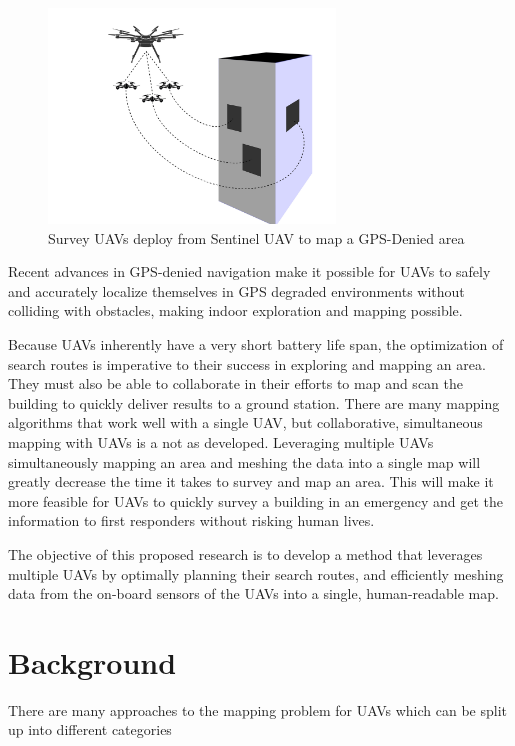 \documentclass[12pt, letterpaper]{article}
\begin{document}
\begin{figure}[h] %
	\centering
	\includegraphics[trim = 0mm 0mm 0mm 0mm,clip,width=3in]{survey_drone_illustration.png}
	\caption{Survey UAVs deploy from Sentinel UAV to map a GPS-Denied area}
	\label{fig:sentinel_survey}
\end{figure}

Recent advances in GPS-denied navigation \cite{Wheeler2017} make it possible for UAVs to safely and accurately localize themselves in GPS degraded environments without colliding with obstacles, making indoor exploration and mapping possible. 

Because UAVs inherently have a very short battery life span, the optimization of search routes is imperative to their success in exploring and mapping an area. They must also be able to collaborate in their efforts to map and scan the building to quickly deliver results to a ground station. There are many mapping algorithms that work well with a single UAV, but collaborative, simultaneous mapping with UAVs is a not as developed. Leveraging multiple UAVs simultaneously mapping an area and meshing the data into a single map will greatly decrease the time it takes to survey and map an area. This will make it more feasible for UAVs to quickly survey a building in an emergency and get the information to first responders without risking human lives.

The objective of this proposed research is to develop a method that leverages multiple UAVs by optimally planning their search routes, and efficiently meshing data from the on-board sensors of the UAVs into a single, human-readable map. 



\section{Background}

There are many approaches to the mapping problem for UAVs which can be split up into different categories
\end{document}
